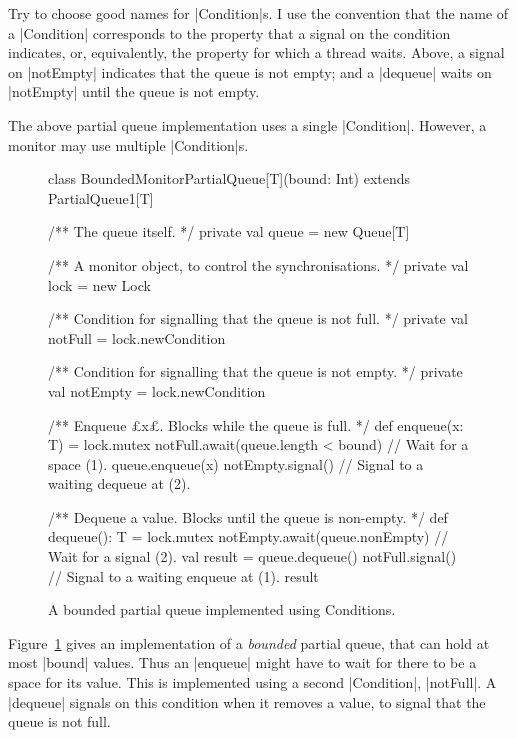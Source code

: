 Try to choose good names for |Condition|s.  I use the convention that the name
of a |Condition| corresponds to the property that a signal on the condition
indicates, or, equivalently, the property for which a thread waits.  Above, a
signal on |notEmpty| indicates that the queue is not empty; and a |dequeue|
waits on |notEmpty| until the queue is not empty.



The above partial queue implementation uses a single |Condition|.  However, a
monitor may use multiple |Condition|s.


\begin{figure}
\begin{scala}
class BoundedMonitorPartialQueue[T](bound: Int) extends PartialQueue1[T]{
  /** The queue itself. */
  private val queue = new Queue[T]

  /** A monitor object, to control the synchronisations. */
  private val lock = new Lock

  /** Condition for signalling that the queue is not full. */
  private val notFull = lock.newCondition

  /** Condition for signalling that the queue is not empty. */
  private val notEmpty = lock.newCondition

  /** Enqueue £x£.  Blocks while the queue is full. */
  def enqueue(x: T) = lock.mutex{
    notFull.await(queue.length < bound) // Wait for a space (1).
    queue.enqueue(x)
    notEmpty.signal() // Signal to a waiting dequeue at (2).
  }

  /** Dequeue a value.  Blocks until the queue is non-empty. */
  def dequeue(): T = lock.mutex{
    notEmpty.await(queue.nonEmpty) // Wait for a signal (2).
    val result = queue.dequeue()
    notFull.signal() // Signal to a waiting enqueue at (1).
    result
  }
}
\end{scala}
\caption{A bounded partial queue implemented using {\scalastyle Condition}s.}
\label{fig:BoundedMonitorPartialQueue}
\end{figure}


Figure~\ref{fig:BoundedMonitorPartialQueue} gives an implementation of a
\emph{bounded} partial queue, that can hold at most |bound| values.  Thus an
|enqueue| might have to wait for there to be a space for its value.  This is
implemented using a second |Condition|, |notFull|.  A |dequeue| signals on
this condition when it removes a value, to signal that the queue is not full. 

